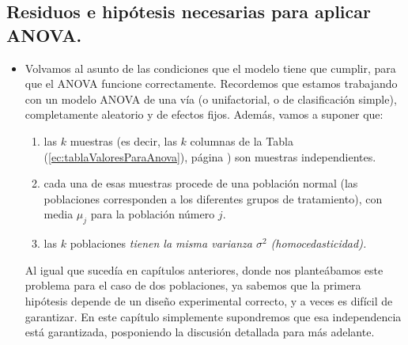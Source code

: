 \subsection{Residuos e hipótesis necesarias para aplicar ANOVA.}\label{subsec:residuosAnova}

\begin{itemize}

    \item Volvamos al asunto de las condiciones que el modelo tiene que cumplir, para que el ANOVA funcione correctamente. Recordemos que estamos trabajando con un modelo ANOVA de una vía (o unifactorial, o de clasificación simple), completamente aleatorio y de efectos fijos. Además, vamos a suponer que:
        \begin{enumerate}
                \item las $k$ muestras (es decir, las $k$ columnas de la Tabla (\ref{ec:tablaValoresParaAnova}), página \pageref{ec:tablaValoresParaAnova}) son muestras independientes.
                \item cada una de esas muestras procede de una población normal (las poblaciones corresponden a los diferentes grupos de tratamiento), con media $\mu_j$ para la población número $j$.
                \item las $k$ poblaciones {\em tienen la misma varianza $\sigma^2$ (homocedasticidad).}
        \end{enumerate}
        Al igual que sucedía en capítulos anteriores, donde nos planteábamos este problema para el caso de dos poblaciones, ya sabemos que la primera hipótesis depende de un diseño experimental correcto, y a veces es difícil de garantizar. En este capítulo simplemente supondremos que esa independencia está garantizada, posponiendo la discusión detallada para más adelante.


\end{itemize}
